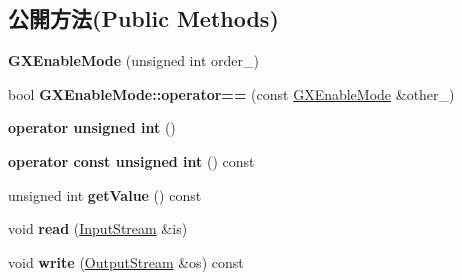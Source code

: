 \subsection*{公開方法(Public Methods)}
\begin{DoxyCompactItemize}
\item 
{\bfseries G\+X\+Enable\+Mode} (unsigned int order\+\_)\hypertarget{class_magnum_1_1_g_x_enable_mode_adf4188817b7832b05a3770dbaeddd7d1}{}\label{class_magnum_1_1_g_x_enable_mode_adf4188817b7832b05a3770dbaeddd7d1}

\item 
bool {\bfseries G\+X\+Enable\+Mode\+::operator==} (const \hyperlink{class_magnum_1_1_g_x_enable_mode}{G\+X\+Enable\+Mode} \&other\+\_\+)\hypertarget{class_magnum_1_1_g_x_enable_mode_ab9fe3558eee1fdb409e7caade64731a1}{}\label{class_magnum_1_1_g_x_enable_mode_ab9fe3558eee1fdb409e7caade64731a1}

\item 
{\bfseries operator unsigned int} ()\hypertarget{class_magnum_1_1_g_x_enable_mode_aa149505333627056ab1898d5b9293a54}{}\label{class_magnum_1_1_g_x_enable_mode_aa149505333627056ab1898d5b9293a54}

\item 
{\bfseries operator const unsigned int} () const \hypertarget{class_magnum_1_1_g_x_enable_mode_ad3fbcd1b2e2b06587638905cdb082f5b}{}\label{class_magnum_1_1_g_x_enable_mode_ad3fbcd1b2e2b06587638905cdb082f5b}

\item 
unsigned int {\bfseries get\+Value} () const \hypertarget{class_magnum_1_1_g_x_enable_mode_a11c457f85d4678400212dd2de8e6f98c}{}\label{class_magnum_1_1_g_x_enable_mode_a11c457f85d4678400212dd2de8e6f98c}

\item 
void {\bfseries read} (\hyperlink{class_magnum_1_1_input_stream}{Input\+Stream} \&is)\hypertarget{class_magnum_1_1_g_x_enable_mode_a12089523850f393a8f869b7b7a226b20}{}\label{class_magnum_1_1_g_x_enable_mode_a12089523850f393a8f869b7b7a226b20}

\item 
void {\bfseries write} (\hyperlink{class_magnum_1_1_output_stream}{Output\+Stream} \&os) const \hypertarget{class_magnum_1_1_g_x_enable_mode_a89a43b4e1d140712964f617a72c2f309}{}\label{class_magnum_1_1_g_x_enable_mode_a89a43b4e1d140712964f617a72c2f309}

\end{DoxyCompactItemize}
